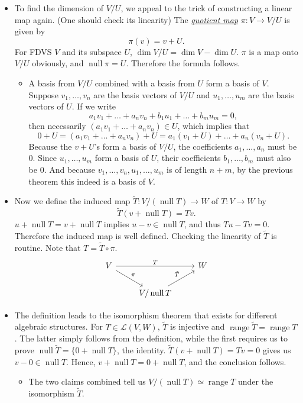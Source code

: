 \documentclass[11pt]{article}
\newcommand{\df}[1]{\ul{\textit{\textsf{#1}}}}
\newcommand{\n}{\operatorname{null}}
\renewcommand{\r}{\operatorname{range}}
\renewcommand{\d}{\dim}
\newcommand{\LVW}{\mathcal{L}(V,W)}
\begin{document}
\begin{itemize}
\begin{itemize}
    \end{itemize}
    \item To find the dimension of $V/U$, we appeal to the trick of constructing a linear map again. (One should check its linearity) The \df{quotient map} $\pi: V \to V/U$ is given by $$\pi(v) = v+U.$$
    For FDVS $V$ and its subspace $U$, $\d V/U = \d V - \d U$. $\pi$ is a map onto $V/U$ obviously, and $\n \pi = U$. Therefore the formula follows.
    \begin{itemize}
        \item A basis from $V/U$ combined with a basis from $U$ form a basis of $V$. Suppose $v_1,\dots,v_n$ are the basis vectors of $V/U$ and $u_1,\dots,u_m$ are the basis vectors of $U$. If we write $$a_1v_1+\dots+a_nv_n + b_1u_1+\dots+b_mu_m = 0,$$ then necessarily $(a_1v_1+\dots+a_nv_n) \in U$, which implies that $$0+U = (a_1v_1+\dots+a_nv_n)+U = a_1(v_1+U)+\dots+a_n(v_n+U).$$ Because the $v+U$'s form a basis of $V/U$, the coefficients $a_1,\dots,a_n$ must be 0. Since $u_1,\dots,u_m$ form a basis of $U$, their coefficients $b_1,\dots,b_m$ must also be 0. And because $v_1,\dots,v_n,u_1,\dots,u_m$ is of length $n+m$, by the previous theorem this indeed is a basis of $V$.
    \end{itemize}
    \item Now we define the induced map $\tilde{T}: V/(\n T) \to W$ of $T: V \to W$ by $$\tilde{T}(v+\n T) = Tv.$$ $u + \n T = v + \n T$ implies $u - v \in \n T$, and thus $Tu-Tv = 0$. Therefore the induced map is well defined. Checking the linearity of $\tilde{T}$ is routine. Note that $T = \tilde{T} \circ \pi$.
    \begin{equation*}
            \begin{tikzcd}
                V \arrow[rr,"T"] \arrow[dr,"\pi"] && W \\
                & {V/\n T} \arrow[ur,"\tilde{T}"]
            \end{tikzcd}
        \end{equation*}
    \item The definition leads to the isomorphism theorem that exists for different algebraic structures. For $T \in \LVW$, $\tilde{T}$ is injective and $\r \tilde{T} = \r T$. The latter simply follows from the definition, while the first requires us to prove $\n \tilde{T} = \{0+\n T\}$, the identity. $\tilde{T}(v+\n T) = Tv = 0$ gives us $v-0 \in \n T$. Hence, $v+\n T = 0+\n T$, and the conclusion follows.
        \begin{itemize}
            \item The two claims combined tell us $V/(\n T) \simeq \r T$ under the isomorphism $\tilde{T}$.
        \end{itemize}
    \end{itemize}
    
\end{document}
